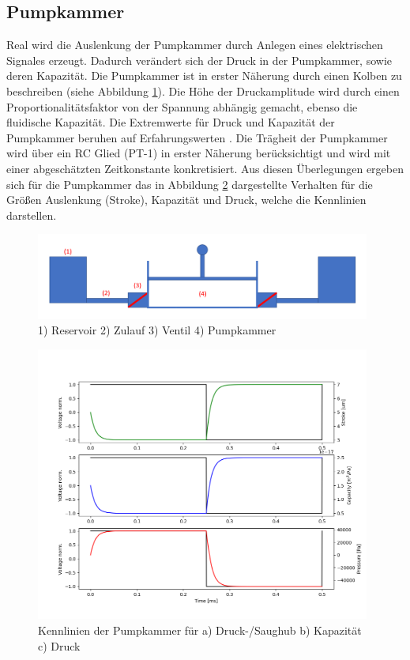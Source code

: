\documentclass[fontsize=12pt, a4paper]{scrartcl}
\begin{document}
\subsection{Pumpkammer}
Real wird die Auslenkung der Pumpkammer durch Anlegen eines elektrischen Signales erzeugt. Dadurch verändert sich der Druck in der Pumpkammer, sowie deren Kapazität. Die Pumpkammer ist in erster Näherung durch einen Kolben zu beschreiben (siehe Abbildung \ref{fig:kammerkonzept}). Die Höhe der Druckamplitude wird durch einen Proportionalitätsfaktor von der Spannung abhängig gemacht, ebenso die fluidische Kapazität. Die Extremwerte für Druck und Kapazität der Pumpkammer beruhen auf Erfahrungswerten \cite{internal}. Die Trägheit der Pumpkammer wird über ein RC Glied (PT-1) in erster Näherung berücksichtigt und wird mit einer abgeschätzten Zeitkonstante konkretisiert. Aus diesen Überlegungen ergeben sich für die Pumpkammer das in Abbildung \ref{fig:kammerkennlinie} dargestellte Verhalten für die Größen Auslenkung (Stroke), Kapazität und Druck, welche die Kennlinien darstellen.

\begin{figure}[H]
	\centering
	\includegraphics[width=0.98\textwidth]{bilder/theorie/pumpe_prinzipskizze.PNG}
	\caption{1) Reservoir 2) Zulauf 3) Ventil 4) Pumpkammer}
	\label{fig:kammerkonzept}
\end{figure}

\begin{figure}[H]
	\centering
	\includegraphics[width=0.98\textwidth]{bilder/Kennlinien/Chamber_kennlinie.PNG}
	\caption{Kennlinien der Pumpkammer für a) Druck-/Saughub b) Kapazität c) Druck}
	\label{fig:kammerkennlinie}
\end{figure}
\end{document}

